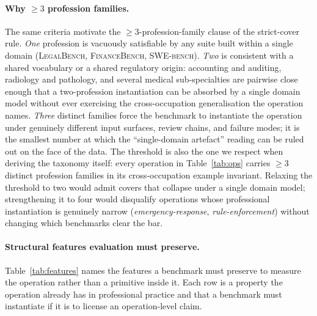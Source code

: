 \documentclass{article}
\begin{document}
\paragraph{Why $\geq\!3$ profession families.} The same criteria motivate the $\geq\!3$-profession-family clause of the strict-cover rule.
\emph{One} profession is vacuously satisfiable by any suite built within a single domain (\textsc{LegalBench}, \textsc{FinanceBench}, \textsc{SWE-bench}).
\emph{Two} is consistent with a shared vocabulary or a shared regulatory origin: accounting and auditing, radiology and pathology, and several medical sub-specialties are pairwise close enough that a two-profession instantiation can be absorbed by a single domain model without ever exercising the cross-occupation generalisation the operation names.
\emph{Three} distinct families force the benchmark to instantiate the operation under genuinely different input surfaces, review chains, and failure modes; it is the smallest number at which the ``single-domain artefact'' reading can be ruled out on the face of the data.
The threshold is also the one we respect when deriving the taxonomy itself: every operation in Table~\ref{tab:ops} carries $\geq\!3$ distinct profession families in its cross-occupation example invariant.
Relaxing the threshold to two would admit covers that collapse under a single domain model; strengthening it to four would disqualify operations whose professional instantiation is genuinely narrow (\emph{emergency-response}, \emph{rule-enforcement}) without changing which benchmarks clear the bar.

\paragraph{Structural features evaluation must preserve.} Table~\ref{tab:features} names the features a benchmark must preserve to measure the operation rather than a primitive inside it.
Each row is a property the operation already has in professional practice and that a benchmark must instantiate if it is to license an operation-level claim.
\end{document}
